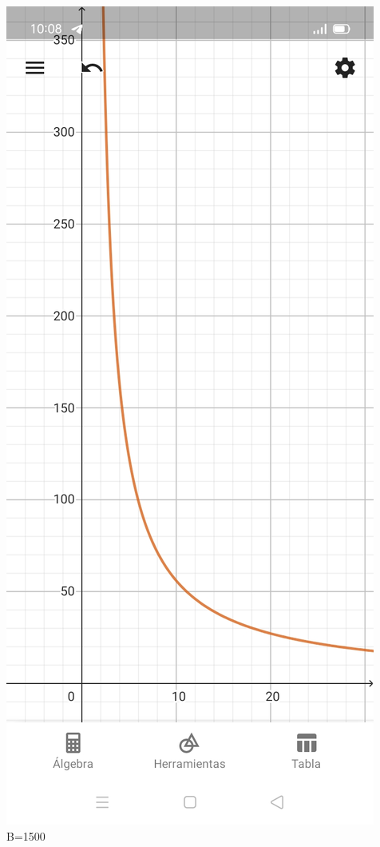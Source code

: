 \documentclass{article}
\begin{document}
\begin{center}
  \includegraphics[scale=0.2]{Imagenes/b_500.jpg}\\
  B=1500\\

\end{center}
\end{document}
